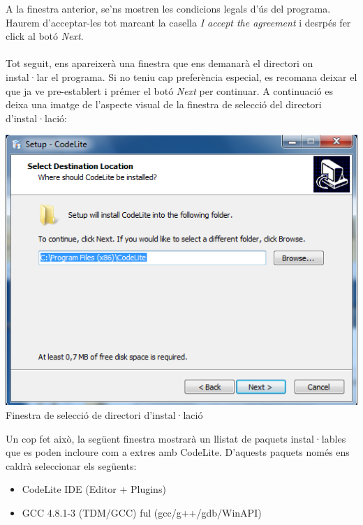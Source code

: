 \documentclass[11pt]{article}
\begin{document}
\newpage

\noindent A la finestra anterior, se'ns mostren les condicions legals d'ús del programa. Haurem d'acceptar-les tot marcant la casella \textit{I accept the agreement} i desrpés fer click al botó \textit{Next}. \\\\
\noindent Tot seguit, ens apareixerà una finestra que ens demanarà el directori on instal·lar el programa. Si no teniu cap preferència especial, es recomana deixar el que ja ve pre-establert i prémer el botó \textit{Next} per continuar. A continuació es deixa una imatge de l'aspecte visual de la finestra de selecció del directori d'instal·lació:

\begin{center}
\includegraphics[scale=0.4]{img/Installer_4.png}\\
\small{Finestra de selecció de directori d'instal·lació}
\end{center}

\noindent Un cop fet això, la següent finestra mostrarà un llistat de paquets instal·lables que es poden incloure com a extres amb CodeLite. D'aquests paquets només ens caldrà seleccionar els següents:

\begin{itemize}
	\item CodeLite IDE (Editor + Plugins)
	\item GCC 4.8.1-3 (TDM/GCC) ful (gcc/g++/gdb/WinAPI)
\end{itemize}

\newpage
\end{document}
